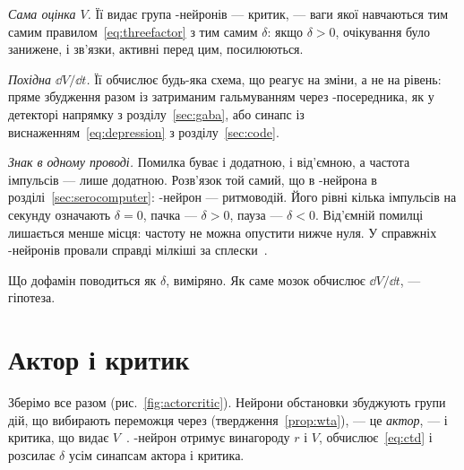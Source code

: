 \emph{Сама оцінка $V$.} Її видає група -нейронів --- критик, --- ваги якої навчаються тим самим правилом~\eqref{eq:threefactor} з тим самим $\delta$: якщо $\delta>0$, очікування було занижене, і зв'язки, активні перед цим, посилюються.

\emph{Похідна $\dd V/\dd t$.} Її обчислює будь-яка схема, що реагує на зміни, а не на рівень: пряме збудження разом із затриманим гальмуванням через -посередника, як у детекторі напрямку з розділу~\ref{sec:gaba}, або синапс із виснаженням~\eqref{eq:depression} з розділу~\ref{sec:code}.

\emph{Знак в одному проводі.} Помилка буває і додатною, і від'ємною, а частота імпульсів --- лише додатною. Розв'язок той самий, що в -нейрона в розділі~\ref{sec:serocomputer}: -нейрон --- ритмоводій. Його рівні кілька імпульсів на секунду означають $\delta=0$, пачка --- $\delta>0$, пауза --- $\delta<0$. Від'ємній помилці лишається менше місця: частоту не можна опустити нижче нуля. У справжніх -нейронів провали справді мілкіші за сплески~\cite{Bayer2005}.

Що дофамін поводиться як $\delta$, виміряно. Як саме мозок обчислює $\dd V/\dd t$, --- гіпотеза.

\section{Актор і критик}

Зберімо все разом (рис.~\ref{fig:actorcritic}). Нейрони обстановки збуджують групи дій, що вибирають переможця через  (твердження~\ref{prop:wta}), --- це \emph{актор}, --- і критика, що видає $V$~\cite{SuttonBarto2018}. -нейрон отримує винагороду $r$ і $V$, обчислює~\eqref{eq:ctd} і розсилає $\delta$ усім синапсам актора і критика.

